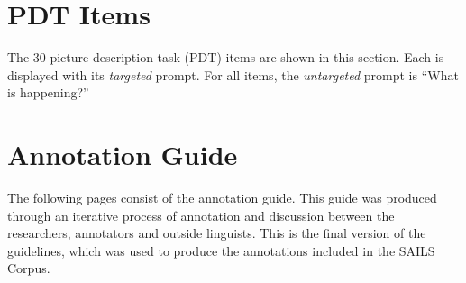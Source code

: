 \begin{appendices}



\chapter{PDT Items}
\label{appendix:PDT_items}
The 30 picture description task (PDT) items are shown in this section. Each is displayed with its \textit{targeted} prompt. For all items, the \textit{untargeted} prompt is ``What is happening?''



\chapter{Annotation Guide}
\label{appendix:annotation_guide}
The following pages consist of the annotation guide. This guide was produced through an iterative process of annotation and discussion between the researchers, annotators and outside linguists. This is the final version of the guidelines, which was used to produce the annotations included in the SAILS Corpus.



\end{appendices}